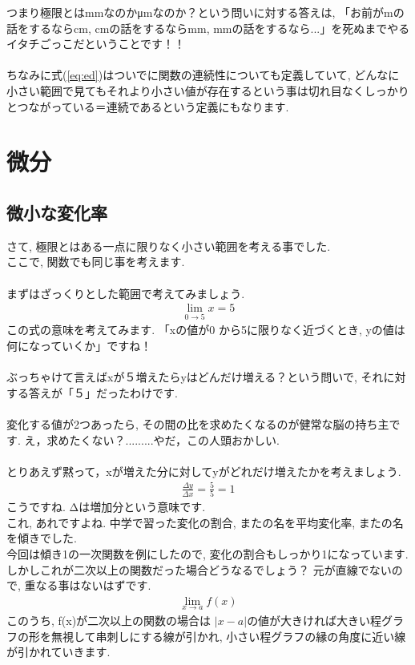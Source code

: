 \documentclass[11pt,a4paper]{jreport}
\begin{document}
つまり極限とはmmなのかμmなのか？という問いに対する答えは, 「お前がmの話をするならcm, cmの話をするならmm, mmの話をするなら...」を死ぬまでやるイタチごっこだということです！！\\
\\
ちなみに式(\ref{eq:ed})はついでに関数の連続性についても定義していて, どんなに小さい範囲で見てもそれより小さい値が存在するという事は切れ目なくしっかりとつながっている＝連続であるという定義にもなります.\\
\section{微分}
\subsection{微小な変化率}
さて, 極限とはある一点に限りなく小さい範囲を考える事でした.\\
ここで, 関数でも同じ事を考えます.\\
\\
まずはざっくりとした範囲で考えてみましょう.\\
\begin{eqnarray}
\lim_{0\to5} x = 5
\end{eqnarray}
この式の意味を考えてみます. 「xの値が0 から5に限りなく近づくとき, yの値は何になっていくか」ですね！\\
\\
ぶっちゃけて言えばxが５増えたらyはどんだけ増える？という問いで, それに対する答えが「５」だったわけです.\\
\\
変化する値が2つあったら, その間の比を求めたくなるのが健常な脳の持ち主です. え，求めたくない？.........やだ，この人頭おかしい.\\
\\
とりあえず黙って，xが増えた分に対してyがどれだけ増えたかを考えましょう.
\begin{eqnarray}
\frac{\Delta y}{\Delta x} = \frac{5}{5} = 1
\end{eqnarray}
こうですね. Δは増加分という意味です.\\
これ, あれですよね. 中学で習った変化の割合, またの名を平均変化率, またの名を傾きでした.\\
今回は傾き1の一次関数を例にしたので, 変化の割合もしっかり1になっています.\\
しかしこれが二次以上の関数だった場合どうなるでしょう？ 元が直線でないので, 重なる事はないはずです.\\
\begin{eqnarray}
\lim_{x \to a} f(x)
\end{eqnarray}
このうち, f(x)が二次以上の関数の場合は $|x-a|$の値が大きければ大きい程グラフの形を無視して串刺しにする線が引かれ, 小さい程グラフの縁の角度に近い線が引かれていきます.\\
\end{document}
